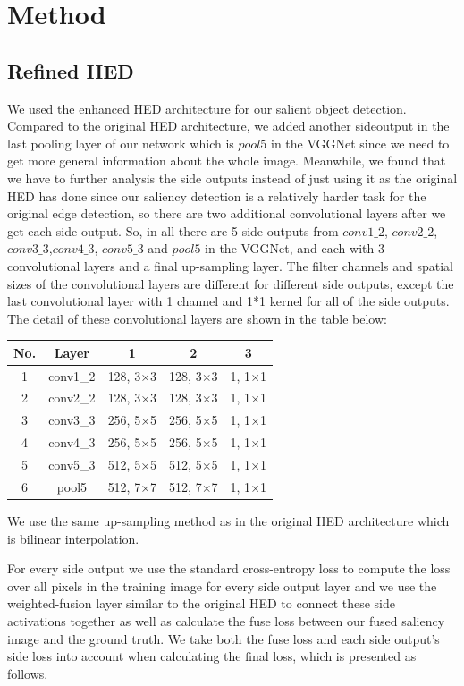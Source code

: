 \documentclass[10pt,journal, compsoc]{IEEEtran}
\begin{document}
\section{Method}

\subsection{Refined HED}
We used the enhanced HED architecture\cite{xie2015holistically} for our salient object detection. Compared to the original HED architecture, we added another sideoutput in the last pooling layer of our network which is $pool5$ in the VGGNet since we need to get more general information about the whole image. Meanwhile, we found that we have to further analysis the side outputs instead of just using it as the original HED has done since our saliency detection is a relatively harder task for the original edge detection, so there are two additional convolutional layers after we get each side output. So, in all there are 5 side outputs from $conv1\_2$, $conv2\_2$, $conv3\_3$,$conv4\_3$, $conv5\_3$ and $pool5$ in the VGGNet, and each with 3 convolutional layers and a final up-sampling layer. The filter channels and spatial sizes of the convolutional layers are different for different side outputs, except the last convolutional layer with 1 channel and 1*1 kernel for all of the side outputs. The detail of these convolutional layers are shown in the table below:

\begin{tabular}{ccccc}
	\hline
	No.& Layer& 1&2&3\\
	\hline
	1& conv1\_2& 128, 3$\times$3 & 128, 3$\times$3 & 1, 1$\times$1 \\
	2& conv2\_2& 128, 3$\times$3 & 128, 3$\times$3 & 1, 1$\times$1 \\
	3& conv3\_3& 256, 5$\times$5 & 256, 5$\times$5 & 1, 1$\times$1 \\
	4& conv4\_3& 256, 5$\times$5 & 256, 5$\times$5 & 1, 1$\times$1 \\
	5& conv5\_3& 512, 5$\times$5 & 512, 5$\times$5 & 1, 1$\times$1 \\
	6& pool5& 512, 7$\times$7 & 512, 7$\times$7 & 1, 1$\times$1 \\
	\hline
\end{tabular}

We use the same up-sampling method as in the original HED architecture which is bilinear interpolation.

For every side output we use the standard cross-entropy loss to compute the loss over all pixels in the training image for every side output layer and we use the weighted-fusion layer similar to the original HED to connect these side activations together as well as calculate the fuse loss between our fused saliency image and the ground truth. We take both the fuse loss and each side output’s side loss into account when calculating the final loss, which is presented as follows.
\end{document}
